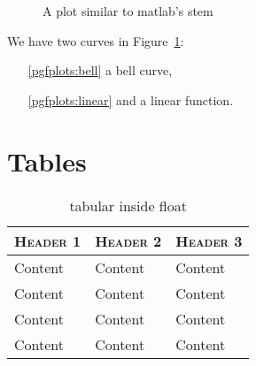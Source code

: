 \documentclass[a4paper,11pt,oneside,showtrims]{alpenthesis}
\begin{document}
\begin{figure}[htb]
    \caption{A plot similar to matlab's stem}
    \label{fig:stem}
\end{figure}

We have two curves in Figure~\ref{fig:stem}:
\begin{itemize}\tightlist
    \item[\ref{pgfplots:bell}] a bell curve,
    \item[\ref{pgfplots:linear}] and a linear function.
\end{itemize}

\lipsum[2]

\chapter{Tables} %
\begin{table}
    \centering
    \caption{tabular inside float}
    \label{tab:float}
    \begin{tabular}{lll}
        \toprule
        \scshape Header 1 & \scshape Header 2 & \scshape Header 3 \\
        \midrule
        Content           & Content           & Content           \\
        Content           & Content           & Content           \\
        Content           & Content           & Content           \\
        Content           & Content           & Content           \\
        \bottomrule
    \end{tabular}
\end{table}
\end{document}
